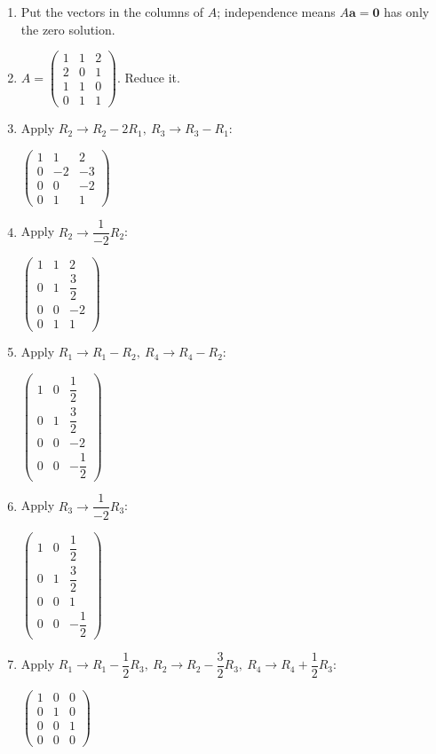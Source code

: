 \documentclass[11pt]{article}
\begin{document}
\begin{tcolorbox}[breakable,colback=ans,colframe=ansb,boxrule=0.5pt,left=4pt,right=4pt,top=2pt,bottom=2pt]\begin{enumerate}[leftmargin=2.2em,itemsep=1pt,topsep=1pt,label=\textbf{Step \arabic*.}]\item Put the vectors in the columns of $A$; independence means $A\mathbf a=\mathbf 0$ has only the zero solution.
\item $A=\begin{pmatrix}1 & 1 & 2 \\ 2 & 0 & 1 \\ 1 & 1 & 0 \\ 0 & 1 & 1\end{pmatrix}$. Reduce it.
\item Apply $R_2\to R_2-2R_1,\ R_3\to R_3-R_1$:\par\smallskip $\displaystyle \begin{pmatrix}1 & 1 & 2 \\ 0 & -2 & -3 \\ 0 & 0 & -2 \\ 0 & 1 & 1\end{pmatrix}$
\item Apply $R_2\to \dfrac{1}{-2} R_2$:\par\smallskip $\displaystyle \begin{pmatrix}1 & 1 & 2 \\ 0 & 1 & \dfrac{3}{2} \\ 0 & 0 & -2 \\ 0 & 1 & 1\end{pmatrix}$
\item Apply $R_1\to R_1-R_2,\ R_4\to R_4-R_2$:\par\smallskip $\displaystyle \begin{pmatrix}1 & 0 & \dfrac{1}{2} \\ 0 & 1 & \dfrac{3}{2} \\ 0 & 0 & -2 \\ 0 & 0 & -\dfrac{1}{2}\end{pmatrix}$
\item Apply $R_3\to \dfrac{1}{-2} R_3$:\par\smallskip $\displaystyle \begin{pmatrix}1 & 0 & \dfrac{1}{2} \\ 0 & 1 & \dfrac{3}{2} \\ 0 & 0 & 1 \\ 0 & 0 & -\dfrac{1}{2}\end{pmatrix}$
\item Apply $R_1\to R_1-\dfrac{1}{2}R_3,\ R_2\to R_2-\dfrac{3}{2}R_3,\ R_4\to R_4+\dfrac{1}{2}R_3$:\par\smallskip $\displaystyle \begin{pmatrix}1 & 0 & 0 \\ 0 & 1 & 0 \\ 0 & 0 & 1 \\ 0 & 0 & 0\end{pmatrix}$

\end{enumerate}
\end{tcolorbox}
\end{document}
